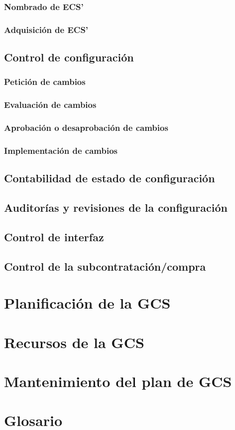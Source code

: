 \documentclass[11pt, a4paper, twoside, titlepage]{article}
\begin{document}
			\subsubsection{Nombrado de ECS'}
			\subsubsection{Adquisición de ECS'}
		\subsection{Control de configuración}
			\subsubsection{Petición de cambios}
			\subsubsection{Evaluación de cambios}
			\subsubsection{Aprobación o desaprobación de cambios}
			\subsubsection{Implementación de cambios}
		\subsection{Contabilidad de estado de configuración}
		\subsection{Auditorías y revisiones de la configuración}
		\subsection{Control de interfaz}
		\subsection{Control de la subcontratación/compra}
	\section{Planificación de la GCS}
	\section{Recursos de la GCS}
	\section{Mantenimiento del plan de GCS}
	\section{Glosario}
		\printglossaries


	\newpage
	
\end{document}
